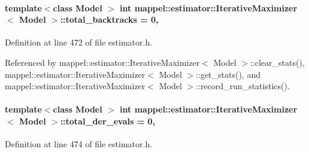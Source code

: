 \paragraph[{\texorpdfstring{total\+\_\+backtracks}{total_backtracks}}]{\setlength{\rightskip}{0pt plus 5cm}template$<$class Model $>$ int {\bf mappel\+::estimator\+::\+Iterative\+Maximizer}$<$ Model $>$\+::total\+\_\+backtracks = 0\hspace{0.3cm}{\ttfamily [protected]}, {\ttfamily [inherited]}}\hypertarget{classmappel_1_1estimator_1_1IterativeMaximizer_a1e081c237c989c530bb101bfb4791073}{}\label{classmappel_1_1estimator_1_1IterativeMaximizer_a1e081c237c989c530bb101bfb4791073}


Definition at line 472 of file estimator.\+h.



Referenced by mappel\+::estimator\+::\+Iterative\+Maximizer$<$ Model $>$\+::clear\+\_\+stats(), mappel\+::estimator\+::\+Iterative\+Maximizer$<$ Model $>$\+::get\+\_\+stats(), and mappel\+::estimator\+::\+Iterative\+Maximizer$<$ Model $>$\+::record\+\_\+run\+\_\+statistics().

\paragraph[{\texorpdfstring{total\+\_\+der\+\_\+evals}{total_der_evals}}]{\setlength{\rightskip}{0pt plus 5cm}template$<$class Model $>$ int {\bf mappel\+::estimator\+::\+Iterative\+Maximizer}$<$ Model $>$\+::total\+\_\+der\+\_\+evals = 0\hspace{0.3cm}{\ttfamily [protected]}, {\ttfamily [inherited]}}\hypertarget{classmappel_1_1estimator_1_1IterativeMaximizer_a79461b74a026ab06f9d1b4a9f96bdaa0}{}\label{classmappel_1_1estimator_1_1IterativeMaximizer_a79461b74a026ab06f9d1b4a9f96bdaa0}


Definition at line 474 of file estimator.\+h.



